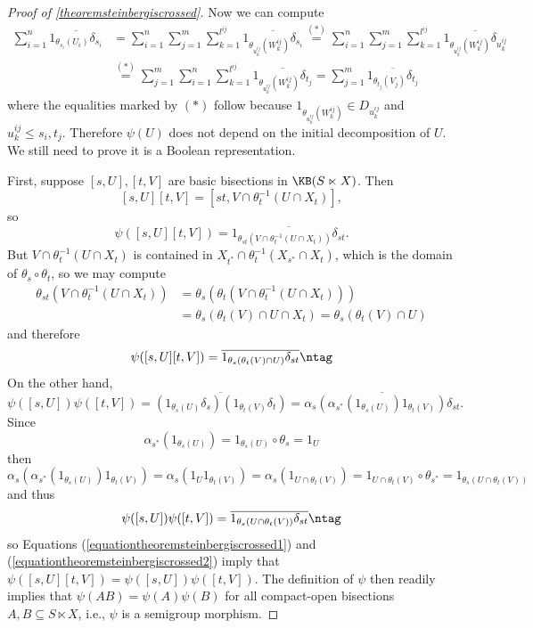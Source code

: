 \begin{proof}[Proof of \ref{theoremsteinbergiscrossed}]
Now we can compute
\begin{align*}
\sum_{i=1}^n\overline{1_{\theta_{s_i}(U_i)}\delta_{s_i}}&=\sum_{i=1}^n\sum_{j=1}^m\sum_{k=1}^{l^{ij}}\overline{1_{\theta_{u_k^{ij}}(W_k^{ij})}\delta_{s_i}}\overset{(\ast)}{=}\sum_{i=1}^n\sum_{j=1}^m\sum_{k=1}^{l^{ij}}\overline{1_{\theta_{u_k^{ij}}(W_k^{ij})}\delta_{u_k^{ij}}}\\
&\overset{(\ast)}{=}\sum_{j=1}^m\sum_{i=1}^n\sum_{k=1}^{l^{ij}}\overline{1_{\theta_{u_k^{ij}}(W_k^{ij})}\delta_{t_j}}=\sum_{j=1}^m\overline{1_{\theta_{t_j}(V_j)}\delta_{t_j}}
\end{align*}
where the equalities marked by $(\ast)$ follow because $1_{\theta_{u_k^{ij}}(W_k^{ij})}\in D_{u_k^{ij}}$ and $u_k^{ij}\leq s_i,t_j$. Therefore $\psi(U)$ does not depend on the initial decomposition of $U$. We still need to prove it is a Boolean representation.

First, suppose $[s,U],[t,V]$ are basic bisections in $\KB(S\ltimes X)$. Then
\[[s,U][t,V]=[st,V\cap\theta_t^{-1}(U\cap X_t)],\]
so
\[\psi([s,U][t,V])=\overline{1_{\theta_{st}(V\cap\theta_t^{-1}(U\cap X_t))}\delta_{st}}.\]
But $V\cap\theta_t^{-1}(U\cap X_t)$ is contained in $X_{t^*}\cap\theta_t^{-1}(X_{s^*}\cap X_t)$, which is the domain of $\theta_s\circ\theta_t$, so we may compute
\begin{align*}
\theta_{st}(V\cap\theta_t^{-1}(U\cap X_t))&=\theta_s(\theta_t(V\cap\theta_t^{-1}(U\cap X_t)))\\
&=\theta_s(\theta_t(V)\cap U\cap X_t)=\theta_s(\theta_t(V)\cap U)
\end{align*}
and therefore
\[\psi([s,U][t,V])=\overline{1_{\theta_s(\theta_t(V)\cap U)}\delta_{st}}\ntag\label{equationtheoremsteinbergiscrossed1}\]
On the other hand,
\[\psi([s,U])\psi([t,V])=\overline{(1_{\theta_s(U)}\delta_s)(1_{\theta_t(V)}\delta_t)}=\overline{\alpha_s(\alpha_{s^*}(1_{\theta_s(U)})1_{\theta_t(V)})\delta_{st}}.\]
Since
\[\alpha_{s^*}(1_{\theta_s(U)})=1_{\theta_s(U)}\circ\theta_s=1_U\]
then
\[\alpha_s(\alpha_{s^*}(1_{\theta_s(U)})1_{\theta_t(V)})=\alpha_s(1_U1_{\theta_t(V)})=\alpha_s(1_{U\cap\theta_t(V)})=1_{U\cap\theta_t(V)}\circ\theta_{s^*}=1_{\theta_s(U\cap\theta_t(V))}\]
and thus
\[\psi([s,U])\psi([t,V])=\overline{1_{\theta_s(U\cap\theta_t(V))}\delta_{st}}\ntag\label{equationtheoremsteinbergiscrossed2}\]
so Equations (\ref{equationtheoremsteinbergiscrossed1}) and (\ref{equationtheoremsteinbergiscrossed2}) imply that $\psi([s,U][t,V])=\psi([s,U])\psi([t,V])$. The definition of $\psi$ then readily implies that $\psi(AB)=\psi(A)\psi(B)$ for all compact-open bisections $A,B\subseteq S\ltimes X$, i.e., $\psi$ is a semigroup morphism.


\end{proof}
